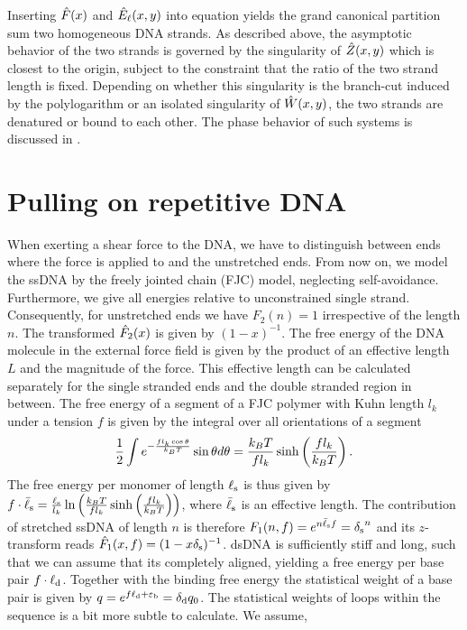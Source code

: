 Inserting $\hat{F}(x)$ and ${\hat{E}_{\ell}}(x,y)$ into equation  yields the grand canonical 
partition sum two homogeneous DNA strands. As described above, the asymptotic behavior of 
the two strands is governed by the singularity of $\hat{Z}(x,y)$ which is closest to the origin, subject to the
constraint that the ratio of the two strand length is fixed. 
Depending on whether this singularity is the branch-cut induced by the polylogarithm 
or an isolated singularity of  $\hat{W}(x,y)$, the two strands are denatured or bound to each other. 
The phase behavior of such systems is discussed in .

\section{Pulling on repetitive DNA}
When exerting a shear force to the DNA, we have to distinguish between ends where the 
force is applied to and the unstretched ends. From now on, we model the ssDNA by the freely jointed 
chain (FJC) model, neglecting self-avoidance. Furthermore, we give all energies relative 
to unconstrained single strand. Consequently, for unstretched ends we have $F_{2}(n)=1$
 irrespective of the length $n$. The transformed $\hat{F}_{2}(x)$ is given by $(1-x)^{{-1}}$. 
 The free energy of the DNA molecule in the external force field is given by the product
 of an effective length $L$ and the magnitude of the force. This effective length can be calculated
 separately for the single stranded ends and the double stranded region in between.  
The free energy of a segment of a FJC polymer with Kuhn length $l_k$ under a tension 
 $f$ is given by the integral over all orientations of a segment
\begin{equation}
\frac{1}{2}\int e^{-\frac{fl_k\cos \theta}{k_BT}}\sin \theta d\theta=\frac{k_BT}{fl_k}\sinh\left(\frac{fl_k}{k_BT}\right).
\end{equation}
The free energy per monomer of length ${\ell_{\rm s}}$ is thus given by 
$f\cdot{\bar{\ell}_{\rm s}}=\frac{{\ell_{\rm s}}}{l_k}\ln\left(\frac{k_BT}{fl_k}\sinh\left(\frac{fl_k}{k_BT}\right)\right)$, 
where ${\bar{\ell}_{\rm s}}$ is an effective length. The contribution of stretched ssDNA of length $n$ is 
therefore $F_{1}(n,f)=e^{n {\bar{\ell}_{\rm s}} f}={\delta_{\rm s}}^n$ and its $z$-transform reads $\hat{F}_{1}(x,f)=(1-x{\delta_{\rm s}})^{-1}$.
dsDNA is sufficiently stiff and long, such that we can assume that its completely aligned, yielding 
a free energy per base pair $f\cdot{\ell_{\rm d}}$.  Together with the binding free energy the statistical weight
of a base pair is given by $q=e^{f{\ell_{\rm d}}+{\varepsilon_{\rm b}}}={\delta_{\rm d}} q_0$. 
The statistical weights of loops within the sequence is a bit more subtle to calculate. We assume, 
